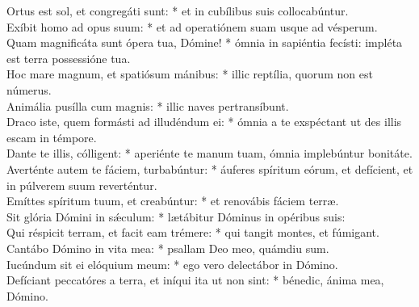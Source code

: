 {	Ortus est sol, et congregáti sunt: * et in cubílibus suis collocabúntur. \\
	Exíbit homo ad opus suum: * et ad operatiónem suam usque ad vésperum. \\
	Quam magnificáta sunt ópera tua, Dómine! * ómnia in sapiéntia fecísti: impléta est terra possessióne tua. \\
	Hoc mare magnum, et spatiósum mánibus: * illic reptília, quorum non est númerus. \\
	Animália pusílla cum magnis: * illic naves pertransíbunt. \\
	Draco iste, quem formásti ad illudéndum ei: * ómnia a te exspéctant ut des illis escam in témpore. \\
	Dante te illis, cólligent: * aperiénte te manum tuam, ómnia implebúntur bonitáte. \\
	Averténte autem te fáciem, turbabúntur: * áuferes spíritum eórum, et defícient, et in púlverem suum reverténtur. \\
	Emíttes spíritum tuum, et creabúntur: * et renovábis fáciem terræ. \\
	Sit glória Dómini in sǽculum: * lætábitur Dóminus in opéribus suis: \\
	Qui réspicit terram, et facit eam trémere: * qui tangit montes, et fúmigant. \\
	Cantábo Dómino in vita mea: * psallam Deo meo, quámdiu sum. \\
	Iucúndum sit ei elóquium meum: * ego vero delectábor in Dómino. \\
	Defíciant peccatóres a terra, et iníqui ita ut non sint: * bénedic, ánima mea, Dómino. \\
}

